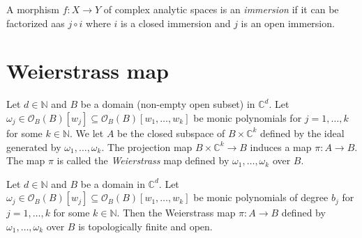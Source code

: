 \begin{definition}
    A morphism $f:X\rightarrow Y$ of complex analytic spaces is an \emph{immersion} if it can be factorized aas $j\circ i$ where $i$ is a closed immersion and $j$ is an open immersion. 
\end{definition}



\section{Weierstrass map}

\begin{definition}
    Let $d\in \mathbb{N}$ and $B$ be a domain (non-empty open subset) in $\mathbb{C}^d$. Let $\omega_j \in \mathcal{O}_B(B)[w_j]\subseteq \mathcal{O}_B(B)[w_1,\ldots,w_k]$ be monic polynomials for $j=1,\ldots,k$ for some $k\in \mathbb{N}$. We let $A$ be the closed subspace of $B\times \mathbb{C}^k$ defined by the ideal generated by $\omega_1,\ldots,\omega_k$. The projection map $B\times \mathbb{C}^k\rightarrow B$ induces a map $\pi:A\rightarrow B$. The map $\pi$ is called the \emph{Weierstrass} map defined by $\omega_1,\ldots,\omega_k$ over $B$.
\end{definition}


\begin{thm}\label{thm-Weiemapfiniteandopen}
    Let $d\in \mathbb{N}$ and $B$ be a domain in $\mathbb{C}^d$. Let $\omega_j \in \mathcal{O}_B(B)[w_j]\subseteq \mathcal{O}_B(B)[w_1,\ldots,w_k]$ be monic polynomials of degree $b_j$ for $j=1,\ldots,k$ for some $k\in \mathbb{N}$. Then the Weierstrass map $\pi:A\rightarrow B$ defined by $\omega_1,\ldots,\omega_k$ over $B$ is topologically finite and open.
\end{thm}


